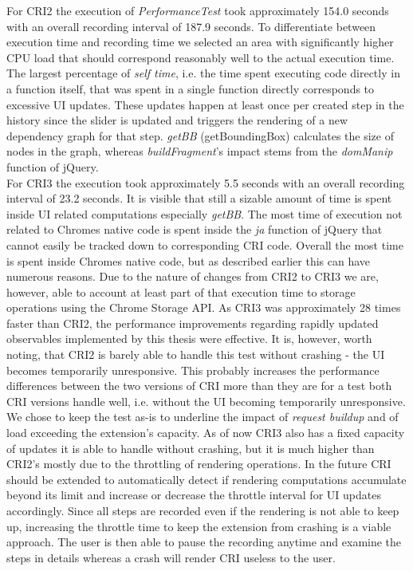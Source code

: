 	For CRI2 the execution of \emph{PerformanceTest} took approximately 154.0 seconds with an overall recording interval of 187.9 seconds. To differentiate between execution time and recording time we selected an area with significantly higher CPU load that should correspond reasonably well to the actual execution time. The largest percentage of \emph{self time}, i.e. the time spent executing code directly in a function itself, that was spent in a single function directly corresponds to excessive UI updates. These updates happen at least once per created step in the history since the slider is updated and triggers the rendering of a new dependency graph for that step. \emph{getBB} (getBoundingBox) calculates the size of nodes in the graph, whereas  \emph{buildFragment}'s impact stems from the \emph{domManip} function of jQuery.\\
	For CRI3 the execution took approximately 5.5 seconds with an overall recording interval of 23.2 seconds. It is visible that still a sizable amount of time is spent inside UI related computations especially \emph{getBB}. The most time of execution not related to Chromes native code is spent inside the \emph{ja} function of jQuery that cannot easily be tracked down to corresponding CRI code. Overall the most time is spent inside Chromes native code, but as described earlier this can have numerous reasons. Due to the nature of changes from CRI2 to CRI3 we are, however, able to account at least part of that execution time to storage operations using the Chrome Storage API. 
	As CRI3 was approximately 28 times faster than CRI2, the performance improvements regarding rapidly updated observables implemented by this thesis were effective. It is, however, worth noting, that CRI2 is barely able to handle this test without crashing - the UI becomes temporarily unresponsive. This probably increases the performance differences between the two versions of CRI more than they are for a test both CRI versions handle well, i.e. without the UI becoming temporarily unresponsive. We chose to keep the test as-is to underline the impact of \emph{request buildup} and of load exceeding the extension's capacity.
	As of now CRI3 also has a fixed capacity of updates it is able to handle without crashing, but it is much higher than CRI2's mostly due to the throttling of rendering operations. In the future CRI should be extended to automatically detect if rendering computations accumulate beyond its limit and increase or decrease the throttle interval for UI updates accordingly. Since all steps are recorded even if the rendering is not able to keep up, increasing the throttle time to keep the extension from crashing is a viable approach. The user is then able to pause the recording anytime and examine the steps in details whereas a crash will render CRI useless to the user.
	

